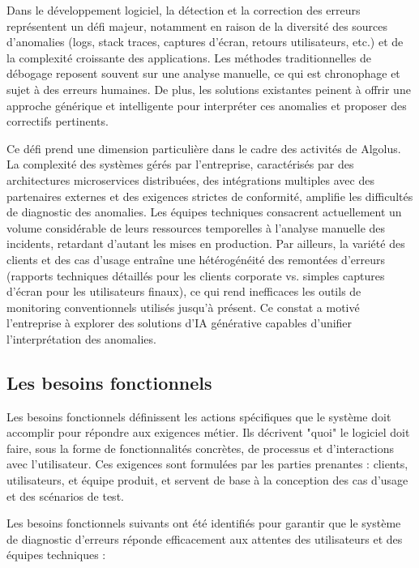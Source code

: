 \documentclass[12pt,a4paper]{report}
\begin{document}
	Dans le développement logiciel, la détection et la correction des erreurs représentent un défi majeur, notamment en raison de la diversité des sources d’anomalies (logs, stack traces, captures d’écran, retours utilisateurs, etc.) et de la complexité croissante des applications. Les méthodes traditionnelles de débogage reposent souvent sur une analyse manuelle, ce qui est chronophage et sujet à des erreurs humaines. De plus, les solutions existantes peinent à offrir une approche générique et intelligente pour interpréter ces anomalies et proposer des correctifs pertinents.
	
	Ce défi prend une dimension particulière dans le cadre des activités de Algolus. La complexité des systèmes gérés par l'entreprise, caractérisés par des architectures microservices distribuées, des intégrations multiples avec des partenaires externes et des exigences strictes de conformité, amplifie les difficultés de diagnostic des anomalies. Les équipes techniques consacrent actuellement un volume considérable de leurs ressources temporelles à l'analyse manuelle des incidents, retardant d'autant les mises en production. Par ailleurs, la variété des clients et des cas d'usage entraîne une hétérogénéité des remontées d'erreurs (rapports techniques détaillés pour les clients corporate vs. simples captures d'écran pour les utilisateurs finaux), ce qui rend inefficaces les outils de monitoring conventionnels utilisés jusqu'à présent. Ce constat a motivé l'entreprise à explorer des solutions d'IA générative capables d'unifier l'interprétation des anomalies.
	
	\subsection{Les besoins fonctionnels}
	
	Les besoins fonctionnels définissent les actions spécifiques que le système doit accomplir pour répondre aux exigences métier. Ils décrivent "quoi" le logiciel doit faire, sous la forme de fonctionnalités concrètes, de processus et d'interactions avec l'utilisateur. Ces exigences sont formulées par les parties prenantes : clients, utilisateurs, et équipe produit,  et servent de base à la conception des cas d’usage et des scénarios de test.
	
	Les besoins fonctionnels suivants ont été identifiés pour garantir que le système de diagnostic d’erreurs réponde efficacement aux attentes des utilisateurs et des équipes techniques :
	
\end{document}

